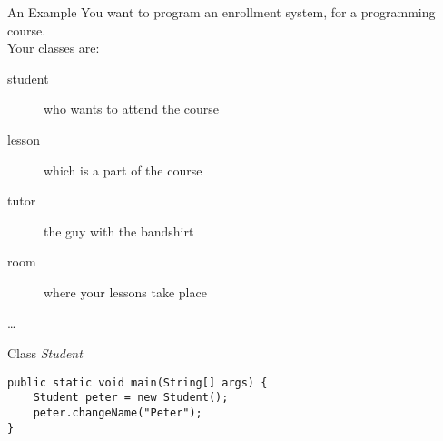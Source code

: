 \begin{frame}{An Example}
	You want to program an enrollment system, for a programming course. \\
	\vspace{1em}
	Your classes are:\\
	\begin{description}
		\item[student] who wants to attend the course
		\item[lesson] which is a part of the course
		\item[tutor] the guy with the bandshirt
		\item[room] where your lessons take place
		\item[\dots]
	\end{description}
\end{frame}


\begin{frame}[fragile]{Class \emph{Student}}
\begin{lstlisting}
public static void main(String[] args) {
	Student peter = new Student();
	peter.changeName("Peter");
}
\end{lstlisting}
\end{frame}

